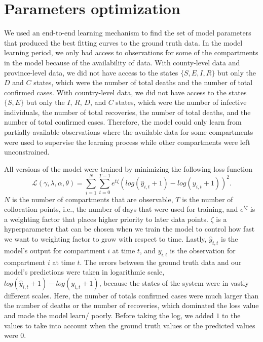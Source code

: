 \section{Parameters optimization}
\label{sec:methodologies-parameters-optimization}

We used an end-to-end learning mechanism to find the set of model parameters that produced the best fitting curves to the ground truth data.
In the model learning period, we only had access to observations for some of the compartments in the model because of the availability of data.
With county-level data and province-level data, we did not have access to the states $\{S, E, I, R\}$ but only the $D$ and $C$ states, which were the number of total deaths and the number of total confirmed cases.
With country-level data, we did not have access to the states $\{S, E\}$ but only the $I$, $R$, $D$, and $C$ states, which were the number of infective individuals, the number of total recoveries, the number of total deaths, and the number of total confirmed cases.
Therefore, the model could only learn from partially-available observations where the available data for some compartments were used to supervise the learning process while other compartments were left unconstrained.

All versions of the model were trained by minimizing the following loss function
\begin{equation}
    \mathcal{L}(\gamma, \lambda, \alpha, \theta) = \sum_{i=1}^N \sum_{t=0}^{T-1} e^{t\zeta} (log(\hat{y}_{i,t} + 1) - log(y_{i,t} + 1))^2.
    \label{eq:ude-model-loss}
\end{equation}
$N$ is the number of compartments that are observable, $T$ is the number of collocation points, i.e., the number of days that were used for training, and $e^{t\zeta}$ is a weighting factor that places higher priority to later data points.
$\zeta$ is a hyperparameter that can be chosen when we train the model to control how fast we want to weighting factor to grow with respect to time.
Lastly, $\hat{y}_{t,t}$ is the model's output for compartment $i$ at time $t$, and $y_{i,t}$ is the observation for compartment $i$ at time $t$.
The errors between the ground truth data and our model's predictions were taken in logarithmic scale, $log(\hat{y}_{i,t} + 1) - log(y_{i,t} + 1)$, because the states of the system were in vastly different scales.
Here, the number of totals confirmed cases were much larger than the number of deaths or the number of recoveries, which dominated the loss value and made the model learn/ poorly.
Before taking the log, we added $1$ to the values to take into account when the ground truth values or the predicted values were $0$.

